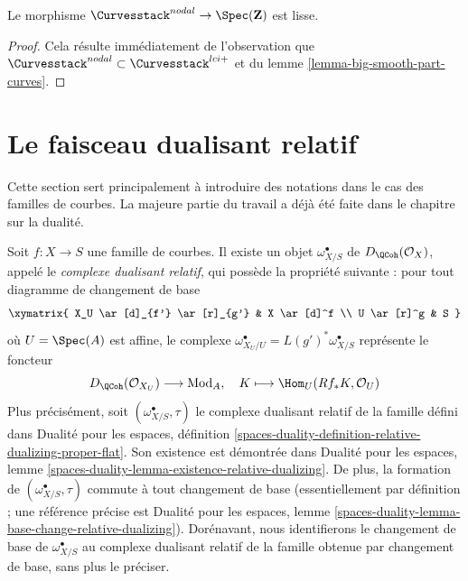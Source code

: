 \begin{lemma}
\label{lemma-nodal-curves-smooth}
Le morphisme $\Curvesstack^{nodal} \to \Spec(\mathbf{Z})$ est lisse.
\end{lemma}

\begin{proof}
Cela résulte immédiatement de l'observation que
$\Curvesstack^{nodal} \subset \Curvesstack^{lci+}$
et du lemme \ref{lemma-big-smooth-part-curves}.
\end{proof}




\section{Le faisceau dualisant relatif}
\label{section-relative-dualizing}

\noindent
Cette section sert principalement
à introduire des notations dans le cas des familles de courbes.
La majeure partie du travail a déjà été faite dans le chapitre sur la dualité.

\medskip\noindent
Soit $f : X \to S$ une famille de courbes. Il existe un objet
$\omega_{X/S}^\bullet$ de $D_\QCoh(\mathcal{O}_X)$,
appelé le {\it complexe dualisant relatif}, qui possède la propriété
suivante : pour tout diagramme de changement de base
$$
\xymatrix{
X_U \ar[d]_{f'} \ar[r]_{g'} & X \ar[d]^f \\
U \ar[r]^g & S
}
$$
où $U = \Spec(A)$ est affine, le complexe
$\omega_{X_U/U}^\bullet = L(g')^*\omega_{X/S}^\bullet$
représente le foncteur
$$
D_\QCoh(\mathcal{O}_{X_U}) \longrightarrow \text{Mod}_A,\quad
K \longmapsto \Hom_U(Rf_*K, \mathcal{O}_U)
$$
Plus précisément, soit $(\omega_{X/S}^\bullet, \tau)$
le complexe dualisant relatif de la famille défini dans
Dualité pour les espaces, définition
\ref{spaces-duality-definition-relative-dualizing-proper-flat}.
Son existence est démontrée dans Dualité pour les espaces, lemme
\ref{spaces-duality-lemma-existence-relative-dualizing}.
De plus, la formation de $(\omega_{X/S}^\bullet, \tau)$ commute
à tout changement de base (essentiellement par définition ; une référence
précise est Dualité pour les espaces, lemme
\ref{spaces-duality-lemma-base-change-relative-dualizing}).
Dorénavant, nous identifierons le changement de base de
$\omega_{X/S}^\bullet$ au complexe dualisant relatif
de la famille obtenue par changement de base, sans plus le préciser.

